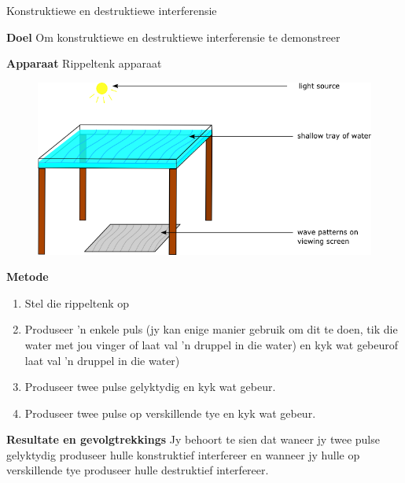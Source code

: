 	
\par
\label{m38802*eip-791}
\begin{g_experiment}{Konstruktiewe en destruktiewe interferensie}

\textbf{Doel}
Om konstruktiewe en destruktiewe interferensie te demonstreer
\par 
\label{m38802*eip7241}\noindent{}\textbf{Apparaat} 
Rippeltenk apparaat
	
\begin{figure}[H] %
    \begin{center}
    \label{m38802*id63458!!!underscore!!!media}\label{m38802*id63458!!!underscore!!!printimage}\includegraphics[width=0.8\columnwidth]{col11305.imgs/m38802_rippletray.png} %
      \vspace{2pt}
    \vspace{.1in}
    \end{center}
 \end{figure}       \par 
\textbf{Metode}
\begin{enumerate}[noitemsep, label=\textbf{\arabic*}. ] 
    \item Stel die rippeltenk op
    \item Produseer 'n enkele puls (jy kan enige manier gebruik om dit te doen, tik die water met jou vinger of laat val 'n druppel in die water) en kyk wat gebeurof laat val 'n druppel in die water)
    \item Produseer twee pulse gelyktydig en kyk wat gebeur.
    \item Produseer twee pulse op verskillende tye en kyk wat gebeur.
\end{enumerate}    
\par 
\textbf{Resultate en gevolgtrekkings}
Jy behoort te sien dat waneer jy twee pulse gelyktydig produseer hulle konstruktief interfereer en wanneer jy hulle op verskillende tye produseer hulle destruktief interfereer.
\par 
\end{g_experiment}


